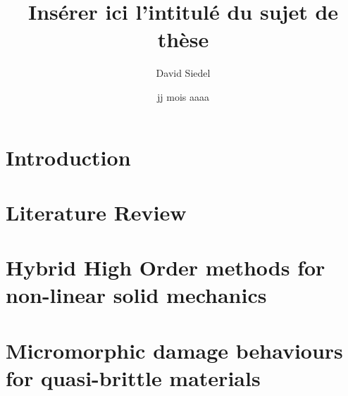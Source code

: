 \documentclass[a4paper, 11pt]{book}
\title{Insérer ici l'intitulé du sujet de thèse}
\author{David Siedel}
\institute{MINES ParisTech}
\date{jj mois aaaa}
\begin{document}
\maketitle{}

\tableofcontents
\listoffigures

\chapter{Introduction}



\chapter{Literature Review}




\chapter{Hybrid High Order methods for non-linear solid mechanics}








\chapter{Micromorphic damage behaviours for quasi-brittle materials}








% 
% 
% 
\end{document}
